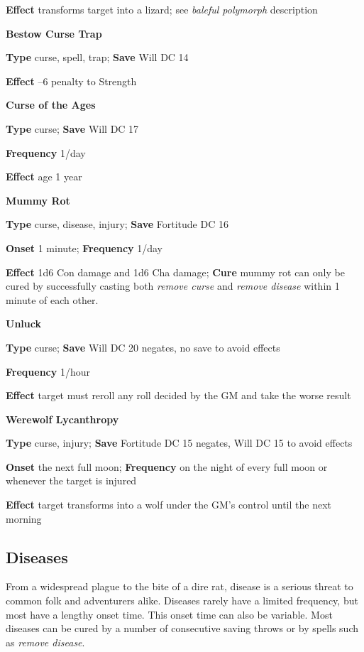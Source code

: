 \textbf{Effect }transforms target into a lizard; see \textit{baleful polymorph} description
				
\textbf{Bestow Curse Trap }
				
\textbf{Type} curse, spell, trap; \textbf{Save} Will DC 14
				
\textbf{Effect }--6 penalty to Strength
				
\textbf{Curse of the Ages }
				
\textbf{Type} curse; \textbf{Save} Will DC 17
				
\textbf{Frequency} 1/day
				
\textbf{Effect }age 1 year
				
\textbf{Mummy Rot }
				
\textbf{Type} curse, disease, injury; \textbf{Save} Fortitude DC 16
				
\textbf{Onset }1 minute; \textbf{Frequency} 1/day
				
\textbf{Effect }1d6 Con damage and 1d6 Cha damage;\textbf{ Cure} mummy rot can only be cured by successfully casting both \textit{remove curse} and \textit{remove disease} within 1 minute of each other.
				
\textbf{Unluck}
				
\textbf{Type} curse; \textbf{Save} Will DC 20 negates, no save to avoid effects
				
\textbf{Frequency} 1/hour
				
\textbf{Effect }target must reroll any roll decided by the GM and take the worse result
				
\textbf{Werewolf Lycanthropy }
				
\textbf{Type} curse, injury; \textbf{Save} Fortitude DC 15 negates, Will DC 15 to avoid effects 
				
\textbf{Onset }the next full moon; \textbf{Frequency} on the night of every full moon or whenever the target is injured
				
\textbf{Effect }target transforms into a wolf under the GM's control until the next morning
				
\subsection{Diseases}

				
From a widespread plague to the bite of a dire rat, disease is a serious threat to common folk and adventurers alike. Diseases rarely have a limited frequency, but most have a lengthy onset time. This onset time can also be variable. Most diseases can be cured by a number of consecutive saving throws or by spells such as \textit{remove disease}.
				
